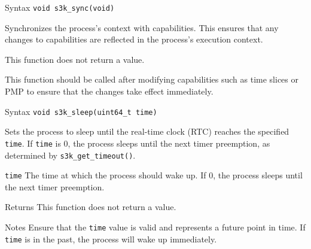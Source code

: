\documentclass[a4paper,11pt]{article}
\newcommand{\syscall}[1]{\texttt{#1}}
\newenvironment{syscalldoc}[1]{
  \begin{tcolorbox}[breakable,title=\subsection{\syscall{#1}}]
  \begin{description}[leftmargin=!,style=nextline,noitemsep]
}{
  \end{description}
  \end{tcolorbox}
}
\begin{document}
\begin{syscalldoc}{s3k\_sync}
  \item[Syntax] \lstinline{void s3k_sync(void)}
  \item[Description] Synchronizes the process's context with capabilities. This ensures that any changes to capabilities are reflected in the process's execution context.
  \item[Returns] This function does not return a value.
  \item[Notes] This function should be called after modifying capabilities such as time slices or PMP to ensure that the changes take effect immediately.
\end{syscalldoc}

\begin{syscalldoc}{s3k\_sleep}
  \item[Syntax] \lstinline{void s3k_sleep(uint64_t time)}
  \item[Description] Sets the process to sleep until the real-time clock (RTC) reaches the specified \verb|time|. If \verb|time| is 0, the process sleeps until the next timer preemption, as determined by \verb|s3k_get_timeout()|.
  \item[Parameters]
    \begin{description}
      \item[]
      \item[\texttt{time}] The time at which the process should wake up. If 0, the process sleeps until the next timer preemption.
    \end{description}
  \item[Returns] This function does not return a value.
  \item[Notes] Ensure that the \verb|time| value is valid and represents a future point in time. If \verb|time| is in the past, the process will wake up immediately.
\end{syscalldoc}
\end{document}
